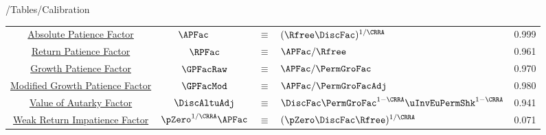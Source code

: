 \documentclass[\econtexRoot/BufferStockTheory]{subfiles}
\providecommand{\TblBox}{}\providecommand{\TblName}{}
\renewcommand{\TblName}{Calibration}
\begin{document}
\begin{verbatimwrite}{\econtexRoot/Tables/\TblName}
\begin{table}
{\begin{tabular}{|c|ccl|c|}
        \hyperlink{APFacDefn}{Absolute Patience Factor}                    & $\APFac_{\phantom{\Rfree}} $ & $\equiv$ & $ (\Rfree \DiscFac)^{1/\CRRA}$                & 0.999 \\
        \hyperlink{RPFacDefn}{Return Patience Factor}                      & $\RPFac$ & $\equiv$ & $\APFac/\Rfree $     & 0.961 \\
        \hyperlink{GPFacRawDefn}{\phantom{Modified }Growth Patience Factor}    & $\GPFacRaw$ & $\equiv$ & $\APFac/\PermGroFac $      & 0.970 \\
        \hyperlink{GPFacRawDefn}{Modified Growth Patience Factor}                      & $\GPFacMod$ & $\equiv$ & $ \APFac/\PermGroFacAdj$& 0.980 \\
        \hyperlink{VAFacDefn}{Value of Autarky Factor}         & $\DiscAltuAdj $ & $\equiv$ & $ \DiscFac \PermGroFac^{1-\CRRA}\uInvEuPermShk^{1-\CRRA}$       & 0.941 \\ 
        \hyperlink{WRIC}{Weak Return Impatience Factor}         & $\pZero^{1/\CRRA} \APFac $ & $\equiv$ & $ (\pZero \DiscFac \Rfree)^{1/\CRRA}$       & 0.071 \\ \hline
      \end{tabular}
    } %

    \settowidth\TableWidth{\usebox{\TblBox}}
    \savebox{\TblShrunkBox}{
      \settowidth{\TblShrunk}{\usebox{\TblBox}}
      \resizebox{0.9\textwidth}{!}{\begin{minipage}{\TblShrunk}
          \usebox{\TblBox}
        \end{minipage}}
    }

    \usebox{\TblShrunkBox}


  \end{table}
\end{verbatimwrite}
\clearpage

\end{document}
